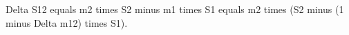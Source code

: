 Delta S12 equals m2 times S2 minus m1 times S1 equals m2 times (S2 minus (1 minus Delta m12) times S1).